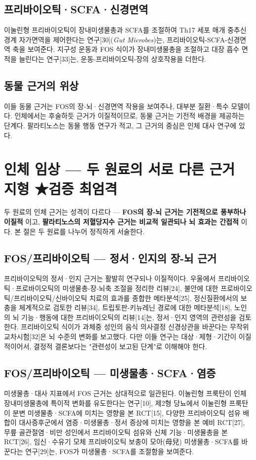 \documentclass[11pt,oneside]{book}
\begin{document}
\subsection{프리바이오틱·SCFA·신경면역}
이눌린형 프리바이오틱이 장내미생물총과 SCFA를 조절하여 Th17 세포 매개 중추신경계 자가면역을 제어한다는 연구[30](\textit{Gut Microbes})는, 프리바이오틱-SCFA-신경면역 축을 보여준다. 지구성 운동과 FOS 식이가 장내미생물총을 조절하고 대장 흡수 면적을 늘린다는 연구[33]는, 운동-프리바이오틱-장의 상호작용을 더한다.

\subsection{동물 근거의 위상}
이들 동물 근거는 FOS의 장-뇌·신경면역 작용을 보여주나, 대부분 질환·특수 모델이다. 인체에서는 후술하듯 근거가 이질적이므로, 동물 근거는 기전적 배경을 제공하는 단계다. 팔라티노스는 동물 행동 연구가 적고, 그 근거의 중심은 인체 대사 연구에 있다.

\section{인체 임상 — 두 원료의 서로 다른 근거 지형 ★검증 최엄격}
두 원료의 인체 근거는 성격이 다르다 — \textbf{FOS의 장-뇌 근거는 기전적으로 풍부하나 이질적} 이고, \textbf{팔라티노스의 저혈당지수 근거는 비교적 일관되나 뇌 효과는 간접적} 이다. 본 절은 두 원료를 나누어 정직하게 서술한다.

\subsection{FOS/프리바이오틱 — 정서·인지의 장-뇌 근거}
프리바이오틱의 정서·인지 근거는 활발히 연구되나 이질적이다. 우울에서 프리바이오틱·프로바이오틱의 미생물총-장-뇌축 조절을 정리한 리뷰[24], 불안에 대한 프로바이오틱/프리바이오틱/신바이오틱 치료의 효과를 종합한 메타분석[25], 정신질환에서의 보충을 체계적으로 검토한 리뷰[34], 트립토판-키뉴레닌 경로에 대한 메타분석[18], 노인의 뇌 기능·행동에 대한 프리바이오틱의 리뷰[14]는, 정서·인지 영역의 관련성을 검토한다. 프리바이오틱 식이가 과체중 성인의 음식 의사결정 신경상관을 바꾼다는 무작위 교차시험[32]은 뇌 수준의 변화를 보고했다. 다만 이들 연구는 대상·제형·기간이 이질적이어서, 결정적 결론보다는 "관련성이 보고된 단계"로 이해해야 한다.

\subsection{FOS/프리바이오틱 — 미생물총·SCFA·염증}
미생물총·대사 지표에서 FOS 근거는 상대적으로 일관된다. 이눌린형 프룩탄이 인체 장내미생물총에 특이적 변화를 유도한다는 연구[10], 제2형 당뇨에서 이눌린형 프룩탄이 분변 미생물총·SCFA에 미치는 영향을 본 RCT[15], 다양한 프리바이오틱 섬유 배합이 대사증후군에서 염증·미생물총·정서 증상에 미치는 영향을 본 예비 RCT[27], 무릎 골관절염·비만 성인에서 프리바이오틱 섬유와 신체 기능·미생물총을 본 RCT[26], 임신·수유기 모체 프리바이오틱 보충이 모아(母兒) 미생물총·SCFA를 바꾼다는 연구[29]는, FOS가 미생물총·SCFA를 조절함을 보여준다.
\end{document}
